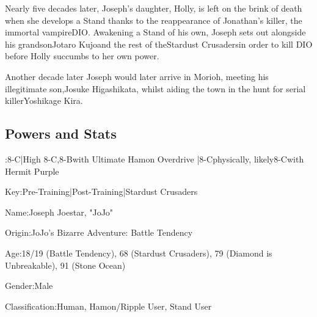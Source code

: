 \documentclass[a4paper,12pt]{article}
\begin{document}
Nearly five decades later, Joseph's daughter, Holly, is left on the brink of death when she develops a Stand thanks to the reappearance of Jonathan's killer, the immortal vampireDIO. Awakening a Stand of his own, Joseph sets out alongside his grandsonJotaro Kujoand the rest of theStardust Crusadersin order to kill DIO before Holly succumbs to her own power.\\ \par \vspace{0.5cm}

Another decade later Joseph would later arrive in Morioh, meeting his illegitimate son,Josuke Higashikata, whilst aiding the town in the hunt for serial killerYoshikage Kira.\\ \par \vspace{0.5cm}

\subsection*{Powers and Stats}\n\nTier:8-C|High 8-C,8-Bwith Ultimate Hamon Overdrive |8-Cphysically, likely8-Cwith Hermit Purple\\ \par \vspace{0.5cm}

Key:Pre-Training|Post-Training|Stardust Crusaders\\ \par \vspace{0.5cm}

Name:Joseph Joestar, "JoJo"\\ \par \vspace{0.5cm}

Origin:JoJo's Bizarre Adventure: Battle Tendency\\ \par \vspace{0.5cm}

Age:18/19 (Battle Tendency), 68 (Stardust Crusaders), 79 (Diamond is Unbreakable), 91 (Stone Ocean)\\ \par \vspace{0.5cm}

Gender:Male\\ \par \vspace{0.5cm}

Classification:Human, Hamon/Ripple User, Stand User\\ \par \vspace{0.5cm}
\end{document}
